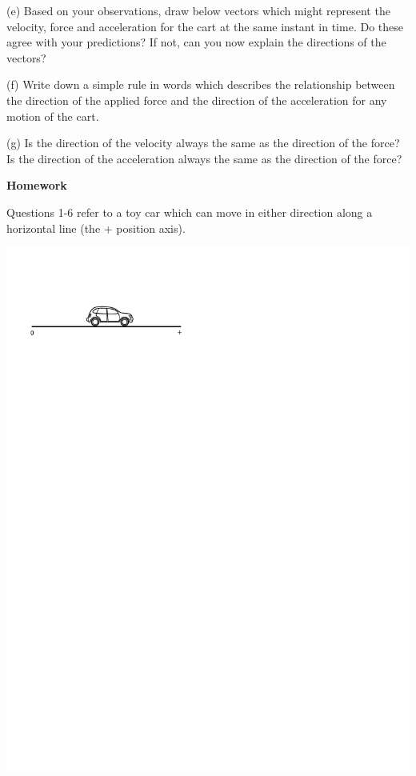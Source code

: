 (e) Based on your observations, draw below vectors which might represent the
velocity, force and acceleration for the cart at the same instant in time. Do
these agree with your predictions? If not, can you now explain the directions
of the vectors?
\answerspace{30mm}

(f) Write down a simple rule in words which describes the relationship between
the direction of the applied force and the direction of the acceleration for
any motion of the cart.
\answerspace{20mm}

(g) Is the direction of the velocity always the same as the direction of the
force? Is the direction of the acceleration always the same as the direction
of the force?
\answerspace{20mm}

\pagebreak[2]
\textbf{Homework }

Questions 1-6 refer to a toy car which can move in either direction along a
horizontal line (the + position axis).

\vspace{0.3cm}
{\par\centering \includegraphics{force2/car_on_ground_pm.pdf} \par}
\vspace{0.3cm}


